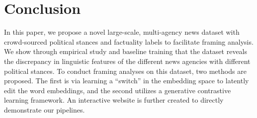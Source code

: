 \chapter{Conclusion}
In this paper, we propose a novel large-scale, multi-agency news dataset with crowd-sourced political stances and factuality labels to facilitate framing analysis. We show through empirical study and baseline training that the dataset reveals the discrepancy in linguistic features of the different news agencies with different political stances. To conduct framing analyses on this dataset, two methods are proposed. The first is via learning a ``switch'' in the embedding space to latently edit the word embeddings, and the second utilizes a generative contrastive learning framework. An interactive website is further created to directly demonstrate our pipelines.